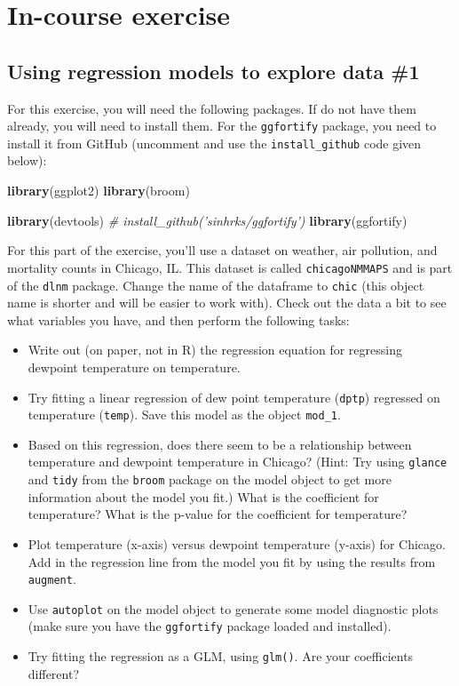 \documentclass[]{book}
\makeatletter
\newenvironment{Shaded}{\begin{snugshade}}{\end{snugshade}}
\newcommand{\KeywordTok}[1]{\textcolor[rgb]{0.13,0.29,0.53}{\textbf{#1}}}
\newcommand{\CommentTok}[1]{\textcolor[rgb]{0.56,0.35,0.01}{\textit{#1}}}
\newcommand{\NormalTok}[1]{#1}
\providecommand{\tightlist}{%
  \setlength{\itemsep}{0pt}\setlength{\parskip}{0pt}}
\newenvironment{kframe}{%
\medskip{}
\setlength{\fboxsep}{.8em}
 \def\at@end@of@kframe{}%
 \ifinner\ifhmode%
  \def\at@end@of@kframe{\end{minipage}}%
  \begin{minipage}{\columnwidth}%
 \fi\fi%
 \def\FrameCommand##1{\hskip\@totalleftmargin \hskip-\fboxsep
 \colorbox{shadecolor}{##1}\hskip-\fboxsep
     \hskip-\linewidth \hskip-\@totalleftmargin \hskip\columnwidth}%
 \MakeFramed {\advance\hsize-\width
   \@totalleftmargin\z@ \linewidth\hsize
   \@setminipage}}%
 {\par\unskip\endMakeFramed%
 \at@end@of@kframe}
\renewenvironment{Shaded}{\begin{kframe}}{\end{kframe}}
\theoremstyle{definition}
\theoremstyle{definition}
\theoremstyle{definition}
\theoremstyle{remark}
\makeatother
\begin{document}
\section{In-course exercise}\label{in-course-exercise-6}

\subsection{Using regression models to explore data
\#1}\label{using-regression-models-to-explore-data-1}

For this exercise, you will need the following packages. If do not have
them already, you will need to install them. For the \texttt{ggfortify}
package, you need to install it from GitHub (uncomment and use the
\texttt{install\_github} code given below):

\begin{Shaded}
\begin{Highlighting}[]
\KeywordTok{library}\NormalTok{(ggplot2)}
\KeywordTok{library}\NormalTok{(broom)}

\KeywordTok{library}\NormalTok{(devtools)}
\CommentTok{# install_github('sinhrks/ggfortify')}
\KeywordTok{library}\NormalTok{(ggfortify)}
\end{Highlighting}
\end{Shaded}

For this part of the exercise, you'll use a dataset on weather, air
pollution, and mortality counts in Chicago, IL. This dataset is called
\texttt{chicagoNMMAPS} and is part of the \texttt{dlnm} package. Change
the name of the dataframe to \texttt{chic} (this object name is shorter
and will be easier to work with). Check out the data a bit to see what
variables you have, and then perform the following tasks:

\begin{itemize}
\tightlist
\item
  Write out (on paper, not in R) the regression equation for regressing
  dewpoint temperature on temperature.
\item
  Try fitting a linear regression of dew point temperature
  (\texttt{dptp}) regressed on temperature (\texttt{temp}). Save this
  model as the object \texttt{mod\_1}.
\item
  Based on this regression, does there seem to be a relationship between
  temperature and dewpoint temperature in Chicago? (Hint: Try using
  \texttt{glance} and \texttt{tidy} from the \texttt{broom} package on
  the model object to get more information about the model you fit.)
  What is the coefficient for temperature? What is the p-value for the
  coefficient for temperature?
\item
  Plot temperature (x-axis) versus dewpoint temperature (y-axis) for
  Chicago. Add in the regression line from the model you fit by using
  the results from \texttt{augment}.
\item
  Use \texttt{autoplot} on the model object to generate some model
  diagnostic plots (make sure you have the \texttt{ggfortify} package
  loaded and installed).
\item
  Try fitting the regression as a GLM, using \texttt{glm()}. Are your
  coefficients different?
\end{itemize}
\end{document}
